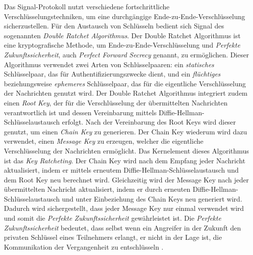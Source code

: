 Das Signal-Protokoll nutzt verschiedene fortschrittliche Verschlüsselungstechniken, um eine durchgängige Ende-zu-Ende-Verschlüsselung sicherzustellen. Für den Austausch von Schlüsseln bedient sich Signal des sogenannten \textit{Double Ratchet Algorithmus}. Der Double Ratchet Algorithmus ist eine kryptografische Methode, um Ende-zu-Ende-Verschlüsselung und \textit{Perfekte Zukunftssicherheit}, auch \textit{Perfect Forward Secrecy} genannt, zu ermöglichen. Dieser Algorithmus verwendet zwei Arten von Schlüsselpaaren: ein \textit{statisches} Schlüsselpaar, das für Authentifizierungszwecke dient, und ein \textit{flüchtiges} beziehungsweise \textit{ephemeres} Schlüsselpaar, das für die eigentliche Verschlüsselung der Nachrichten genutzt wird. Der Double Ratchet Algorithmus integriert zudem einen \textit{Root Key}, der für die Verschlüsselung der übermittelten Nachrichten verantwortlich ist und dessen Vereinbarung mittels Diffie-Hellman-Schlüsselaustausch erfolgt. Nach der Vereinbarung des Root Keys wird dieser genutzt, um einen \textit{Chain Key} zu generieren. Der Chain Key wiederum wird dazu verwendet, einen \textit{Message Key} zu erzeugen, welcher die eigentliche Verschlüsselung der Nachrichten ermöglicht. Das Kernelement dieses Algorithmus ist das \textit{Key Ratcheting}. Der Chain Key wird nach dem Empfang jeder Nachricht aktualisiert, indem er mittels erneutem Diffie-Hellman-Schlüsselaustausch und dem Root Key neu berechnet wird. Gleichzeitig wird der Message Key nach jeder übermittelten Nachricht aktualisiert, indem er durch erneuten Diffie-Hellman-Schlüsselaustausch und unter Einbeziehung des Chain Keys neu generiert wird. Dadurch wird sichergestellt, dass jeder Message Key nur einmal verwendet wird und somit die \textit{Perfekte Zukunftssicherheit} gewährleistet ist. Die \textit{Perfekte Zukunftssicherheit} bedeutet, dass selbst wenn ein Angreifer in der Zukunft den privaten Schlüssel eines Teilnehmers erlangt, er nicht in der Lage ist, die Kommunikation der Vergangenheit zu entschlüsseln \Parencite{Signal_DoubleRatchet}.
